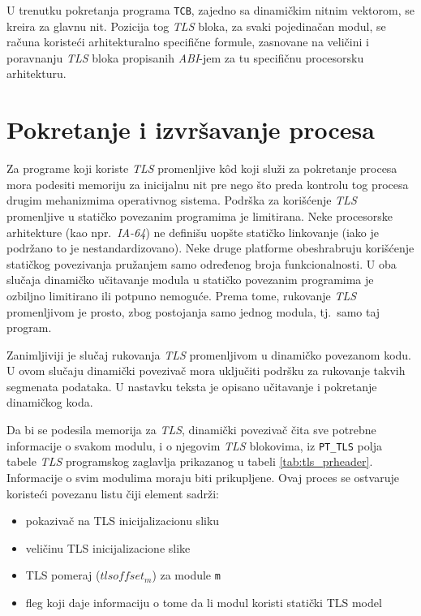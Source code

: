 \documentclass[12pt,oneside]{memoir}
\begin{document}
U trenutku pokretanja programa \texttt{TCB}, zajedno sa dinamičkim nitnim vektorom, se kreira za glavnu nit. Pozicija tog \emph{TLS} bloka, za svaki pojedinačan modul, se računa koristeći arhitekturalno specifične formule, zasnovane na veličini i poravnanju \emph{TLS} bloka propisanih \emph{ABI}-jem za tu specifičnu procesorsku arhitekturu.

\section{Pokretanje i izvršavanje procesa}

Za programe koji koriste \emph{TLS} promenljive k\^{o}d koji služi za pokretanje procesa mora podesiti memoriju za inicijalnu nit pre nego što preda kontrolu tog procesa drugim mehanizmima operativnog sistema. Podrška za korišćenje \emph{TLS} promenljive u statičko povezanim programima je limitirana. Neke procesorske arhitekture (kao npr.~\emph{IA-64}) ne definišu uopšte statičko linkovanje (iako je podržano to je nestandardizovano). Neke druge platforme obeshrabruju korišćenje statičkog povezivanja pružanjem samo određenog broja funkcionalnosti. U oba slučaja dinamičko učitavanje modula u statičko povezanim programima je ozbiljno limitirano ili potpuno nemoguće. Prema tome, rukovanje \emph{TLS} promenljivom je prosto, zbog postojanja samo jednog modula, tj.~samo taj program.

Zanimljiviji je slučaj rukovanja \emph{TLS} promenljivom u dinamičko povezanom kodu. U ovom slučaju dinamički povezivač mora uključiti podršku za rukovanje takvih segmenata podataka. U nastavku teksta je opisano učitavanje i pokretanje dinamičkog koda.

Da bi se podesila memorija za \emph{TLS}, dinamički povezivač čita sve potrebne informacije o svakom modulu, i o njegovim \emph{TLS} blokovima, iz \texttt{PT\_TLS} polja tabele \emph{TLS} programskog zaglavlja prikazanog u tabeli \ref{tab:tls_prheader}. Informacije o svim modulima moraju biti prikupljene. Ovaj proces se ostvaruje koristeći povezanu listu čiji element sadrži:

\begin{itemize}
	\item pokazivač na TLS inicijalizacionu sliku
	\item veličinu TLS inicijalizacione slike
	\item TLS pomeraj (\texttt{$tlsoffset_m$}) za module \texttt{m}
	\item fleg koji daje informaciju o tome da li modul koristi statički TLS model
\end{itemize}
\end{document}
